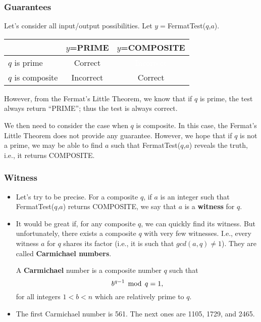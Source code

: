 \begin{frame}\frametitle{Guarantees}
  Let's consider all input/output possibilities.  Let
  $y=$FermatTest($q$,$a$).

  \vspace{0.1in}
  \begin{tabular}{|l|c|c|}
    \hline
    & $y$=PRIME & $y$=COMPOSITE \\
    \hline
    $q$ is prime & Correct & \textcolor{white}{Incorrect} \\
    \hline
    $q$ is composite & Incorrect & Correct \\
    \hline
  \end{tabular}

  \vspace{0.2in} However, from the Fermat's Little Theorem, we
  know that if $q$ is prime, the test always return ``PRIME''; thus
  the test is always correct.

  \pause We then need to consider the case when $q$ is
  composite. \pause In this case, the Fermat's Little Theorem does not
  provide any guarantee. \pause However, we hope that if $q$ is not a
  prime, we may be able to find $a$ such that FermatTest($q$,$a$)
  reveals the truth, i.e., it returns COMPOSITE.
\end{frame}

\begin{frame}\frametitle{Witness}
  \begin{itemize}
  \item 
    Let's try to be precise.  For a composite $q$, if $a$ is an
    integer such that FermatTest($q$,$a$) returns COMPOSITE, we say
    that $a$ is a {\bf witness} for $q$.
  \item
    It would be great if, for any composite $q$, we can quickly find
    its witness.  \pause But unfortunately, there exists a composite
    $q$ with very few witnesses. I.e., every witness $a$ for $q$
    shares its factor (i.e., it is such that $gcd(a,q)\neq 1$).
    \pause They are called {\bf Carmichael numbers}.
    \begin{tcolorbox}
      A {\bf Carmichael} number is a composite number $q$ such that
      \[ b^{q-1}\,\bmod\, q = 1, \]
      for all integers $1<b<n$ which are relatively prime to $q$.
    \end{tcolorbox}
    \pause
  \item The first Carmichael number is 561.  The next ones are 1105,
    1729, and 2465.
  \end{itemize}
\end{frame}

